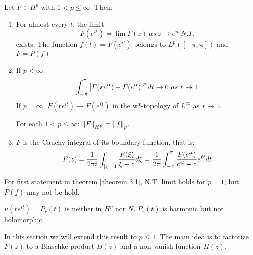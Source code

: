 \begin{theorem}\label{theorem 3.1}
    Let $F\in H^p$ with $1<p\leq \infty$. Then:
    \begin{enumerate}
        \item For almost every $t$. the limit
              \begin{equation*}
                  F(e^{it})=\lim{F(z)} ~as ~z\to e^{it} ~N.T.
              \end{equation*}
              exists. The function $f(t)=F(e^{it})$ belongs to $L^p([-\pi,\pi])$ and $F=P(f)$
        \item If $p<\infty$:
              \begin{equation*}
                  \int_{-\pi}^\pi{\left\lvert F(re^{it})-F(e^{it})\right\rvert^p d t} \to 0~as~r\to 1
              \end{equation*}
              If $p=\infty$, $F(re^{it})\to F(e^{it})$ in the w*-topology of $L^\infty$ as $r\to 1$.\par
              For each $1<p\leq\infty$: $\left\lVert F\right\rVert_{H^p}=\left\lVert f\right\rVert_p$.
        \item $F$ is the Cauchy integral of its boundary function, that is:
              \begin{equation*}
                  F(z)=\frac{1}{2\pi i}\int_{\left\lvert\xi\right\rvert=1}{\frac{F(\xi)}{\xi-z}d\xi}=\frac{1}{2\pi}\int_{-\pi}^{\pi}{\frac{F(e^{it})}{e^{it}-z}e^{it}d t}
              \end{equation*}
    \end{enumerate}

\end{theorem}
\begin{remark}
    For first statement in theorem \ref{theorem 3.1}, N.T. limit holds for $p=1$, but $P(f)$ may not be hold.
\end{remark}
\begin{remark}
    $u(re^{it})=P_r(t)$ is neither in $H^p$ nor $N$. $P_r(t)$ is harmonic but not holomorphic.
\end{remark}
In this section
we will extend this result to $p\leq 1$. The main idea is to factorize $F(z)$ to a Blaschke product $B(z)$ and a non-vanish
function $H(z)$.

